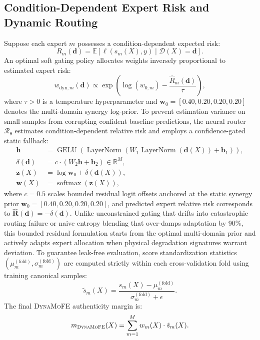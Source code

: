 \documentclass[conference]{IEEEtran}
\newcommand{\dynamofe}{\textsc{DynaMoFE}}
\begin{document}
\subsection{Condition-Dependent Expert Risk and Dynamic Routing}
Suppose each expert $m$ possesses a condition-dependent expected risk:
\begin{equation}
    R_m(\mathbf{d}) = \mathbb{E}[\ell(s_m(X), y) \mid \mathcal{D}(X) = \mathbf{d}].
\end{equation}
An optimal soft gating policy allocates weights inversely proportional to estimated expert risk:
\begin{equation}
    w_{\text{dyn}, m}(\mathbf{d}) \propto \exp\left( \log(w_{0, m}) - \frac{\hat{R}_m(\mathbf{d})}{\tau} \right),
\end{equation}
where $\tau > 0$ is a temperature hyperparameter and $\mathbf{w}_0 = [0.40, 0.20, 0.20, 0.20]$ denotes the multi-domain synergy log-prior. To prevent estimation variance on small samples from corrupting confident baseline predictions, the neural router $\mathcal{R}_\theta$ estimates condition-dependent relative risk and employs a confidence-gated static fallback:
\begin{align}
    \mathbf{h} &= \operatorname{GELU}(\operatorname{LayerNorm}(W_1 \operatorname{LayerNorm}(\mathbf{d}(X)) + \mathbf{b}_1)), \\
    \delta(\mathbf{d}) &= c \cdot \left(W_2 \mathbf{h} + \mathbf{b}_2\right) \in \mathbb{R}^M, \\
    \mathbf{z}(X) &= \log \mathbf{w}_0 + \delta(\mathbf{d}(X)), \\
    \mathbf{w}(X) &= \operatorname{softmax}(\mathbf{z}(X)),
\end{align}
where $c=0.5$ scales bounded residual logit offsets anchored at the static synergy prior $\mathbf{w}_0 = [0.40, 0.20, 0.20, 0.20]$, and predicted expert relative risk corresponds to $\hat{\mathbf{R}}(\mathbf{d}) = -\delta(\mathbf{d})$. Unlike unconstrained gating that drifts into catastrophic routing failure or naive entropy blending that over-damps adaptation by 90\%, this bounded residual formulation starts from the optimal multi-domain prior and actively adapts expert allocation when physical degradation signatures warrant deviation.
To guarantee leak-free evaluation, score standardization statistics $(\mu_m^{(\text{fold})}, \sigma_m^{(\text{fold})})$ are computed strictly within each cross-validation fold using training canonical samples:
\begin{equation}
    \tilde{s}_m(X) = \frac{s_m(X) - \mu_m^{(\text{fold})}}{\sigma_m^{(\text{fold})} + \epsilon}.
\end{equation}
The final \dynamofe{} authenticity margin is:
\begin{equation}
    m_{\dynamofe}(X) = \sum_{m=1}^M w_m(X) \cdot \tilde{s}_m(X).
\end{equation}
\end{document}
